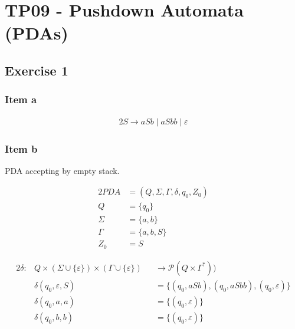 \documentclass[docid=TP09]{tcom_TP}
\begin{document}
\setcounter{section}{8}
\section{TP09 - Pushdown Automata (PDAs)}
{
\renewcommand{\thesubsubsection}{\thesubsection\alph{subsubsection}}
\subsection{Exercise 1}
\subsubsection{Item a}
\begin{alignat*}{2}
	S \rightarrow aSb\mid aSbb\mid \varepsilon
\end{alignat*}
\subsubsection{Item b} \label{TP09_1b}
PDA accepting by empty stack.
\begin{center}
\begin{minipage}[c]{0.30\textwidth}
\begin{alignat*}{2}
	PDA    &= (Q, \Sigma, \Gamma, \delta, q_0, Z_0)\\
	Q      &= \{q_0\}\\
	\Sigma &= \{a,b\}\\
	\Gamma &= \{a,b,S\}\\
	Z_0    &= S
\end{alignat*}
\end{minipage}%
\begin{minipage}[c]{0.65\textwidth}
\begin{alignat*}{2}
	\delta \colon & Q \times (\Sigma \cup \{\varepsilon\}) \times (\Gamma \cup \{\varepsilon\}) &&\rightarrow \mathscr{P}(Q \times \Gamma^*))\\
	&\delta(q_0, \varepsilon, S) &&=\{(q_0, aSb), (q_0, aSbb), (q_0, \varepsilon)\}\\
	&\delta(q_0, a, a) &&= \{(q_0, \varepsilon)\}\\
	&\delta(q_0, b, b) &&= \{(q_0, \varepsilon)\}
\end{alignat*}
\end{minipage}
\end{center}
}
\end{document}
